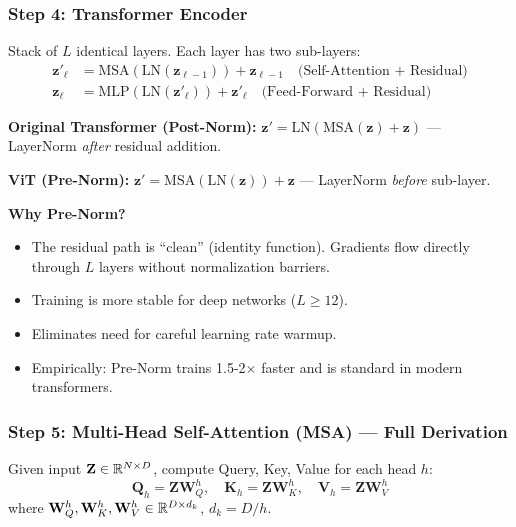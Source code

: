 \subsubsection{Step 4: Transformer Encoder}
Stack of $L$ identical layers. Each layer has two sub-layers:
\begin{align}
\mathbf{z}'_\ell &= \text{MSA}(\text{LN}(\mathbf{z}_{\ell-1})) + \mathbf{z}_{\ell-1} \quad \text{(Self-Attention + Residual)} \label{eq:vit_msa}\\
\mathbf{z}_\ell &= \text{MLP}(\text{LN}(\mathbf{z}'_\ell)) + \mathbf{z}'_\ell \quad \text{(Feed-Forward + Residual)} \label{eq:vit_mlp}
\end{align}

\begin{keybox}
\textbf{Original Transformer (Post-Norm):}
$\mathbf{z}' = \text{LN}(\text{MSA}(\mathbf{z}) + \mathbf{z})$ — LayerNorm \emph{after} residual addition.

\textbf{ViT (Pre-Norm):}
$\mathbf{z}' = \text{MSA}(\text{LN}(\mathbf{z})) + \mathbf{z}$ — LayerNorm \emph{before} sub-layer.

\textbf{Why Pre-Norm?}
\begin{itemize}
\item The residual path is ``clean'' (identity function). Gradients flow directly through $L$ layers without normalization barriers.
\item Training is more stable for deep networks ($L \geq 12$).
\item Eliminates need for careful learning rate warmup.
\item Empirically: Pre-Norm trains 1.5-2$\times$ faster and is standard in modern transformers.
\end{itemize}
\end{keybox}

\subsubsection{Step 5: Multi-Head Self-Attention (MSA) — Full Derivation}

Given input $\mathbf{Z} \in \mathbb{R}^{N \times D}$, compute Query, Key, Value for each head $h$:
$$\mathbf{Q}_h = \mathbf{Z}\mathbf{W}_Q^h, \quad \mathbf{K}_h = \mathbf{Z}\mathbf{W}_K^h, \quad \mathbf{V}_h = \mathbf{Z}\mathbf{W}_V^h$$
where $\mathbf{W}_Q^h, \mathbf{W}_K^h, \mathbf{W}_V^h \in \mathbb{R}^{D \times d_k}$, $d_k = D/h$.

